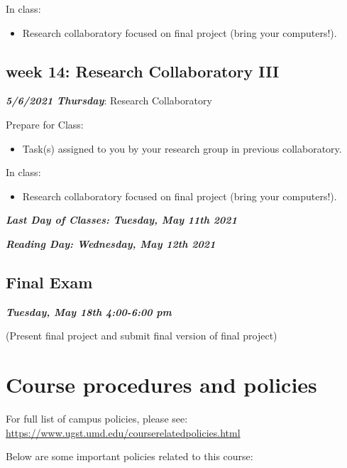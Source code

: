 \documentclass[
]{book}
\providecommand{\tightlist}{%
  \setlength{\itemsep}{0pt}\setlength{\parskip}{0pt}}
\begin{document}
In class:

\begin{itemize}
\tightlist
\item
  Research collaboratory focused on final project (bring your computers!).
\end{itemize}

\hypertarget{week-14-research-collaboratory-iii}{%
\subsection{week 14: Research Collaboratory III}\label{week-14-research-collaboratory-iii}}

\textbf{\emph{5/6/2021 Thursday}}: Research Collaboratory

Prepare for Class:

\begin{itemize}
\tightlist
\item
  Task(s) assigned to you by your research group in previous collaboratory.
\end{itemize}

In class:

\begin{itemize}
\tightlist
\item
  Research collaboratory focused on final project (bring your computers!).
\end{itemize}

\textbf{\emph{Last Day of Classes: Tuesday, May 11th 2021}}

\textbf{\emph{Reading Day: Wednesday, May 12th 2021}}

\hypertarget{final-exam}{%
\subsection{Final Exam}\label{final-exam}}

\textbf{\emph{Tuesday, May 18th 4:00-6:00 pm}}

(Present final project and submit final version of final project)

\hypertarget{course-procedures-and-policies}{%
\section{Course procedures and policies}\label{course-procedures-and-policies}}

For full list of campus policies, please see: \url{https://www.ugst.umd.edu/courserelatedpolicies.html}

Below are some important policies related to this course:
\end{document}
